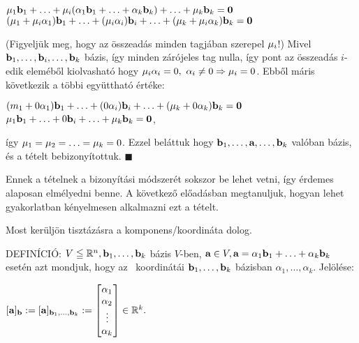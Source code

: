 \documentclass[a4paper,11.5pt]{article}
\begin{document}
	\begin{center}
		$\mu_1\textbf{b}_1+\ldots+\mu_i(\alpha_1\textbf{b}_1+\ldots+\alpha_k\textbf{b}_k)+\ldots+\mu_k\textbf{b}_k=\textbf{0}$\\
		$(\mu_1+\mu_i\alpha_1)\textbf{b}_1+\ldots+(\mu_i\alpha_i)\textbf{b}_i+\ldots+(\mu_k+\mu_i\alpha_k)\textbf{b}_k=\textbf{0}$
	\end{center}
	(Figyeljük meg, hogy az összeadás minden tagjában szerepel $\mu_i$!) Mivel $\textbf{b}_1,\ldots,\textbf{b}_i,\ldots,\textbf{b}_k$ bázis, így minden zárójeles tag nulla, így pont az összeadás $i$-edik eleméből kiolvasható hogy $\m_i\alpha_i=0,\ \alpha_i\not=0 \Rightarrow \mu_i=0$. Ebből máris következik a többi együttható értéke:
	
	\begin{center}
		$(m_1+0\alpha_1)\textbf{b}_1+\ldots+(0\alpha_i)\textbf{b}_i+\ldots+(\mu_k+0\alpha_k)\textbf{b}_k=\textbf{0}$\\
		$\mu_1\textbf{b}_1+\ldots+0\textbf{b}_i+\ldots+\mu_k\textbf{b}_k=\textbf{0}$,\\
	\end{center}
	   így $\mu_1=\mu_2=\ldots=\mu_k=0$. Ezzel beláttuk hogy $\textbf{b}_1,\ldots,\textbf{a},\ldots,\textbf{b}_k$ valóban bázis, és a tételt bebizonyítottuk. $\blacksquare$
	
	Ennek a tételnek a bizonyítási módszerét sokszor be lehet vetni, így érdemes alaposan elmélyedni benne. A következő előadásban megtanuljuk, hogyan lehet gyakorlatban kényelmesen alkalmazni ezt a tételt.
	
	\smallskip
	Most kerüljön tisztázásra a komponens/koordináta dolog.
	
	DEFINÍCIÓ: $V\leqq \mathbb{R}^{n}, \textbf{b}_1,\ldots,\textbf{b}_k$ bázis $V$-ben, $\textbf{a} \in V, \textbf{a} = \alpha_1\textbf{b}_1+\ldots+\alpha_k\textbf{b}_k$ esetén azt mondjuk, hogy az \a~koordinátái $\textbf{b}_1,\ldots,\textbf{b}_k$ bázisban $\alpha_1, \ldots, \alpha_k$. Jelölése:
	
	\begin{center}
		$[\a]_\b:=[\a]_{\b_1,\ldots,\b_k}:=
		\begin{bmatrix}
			\alpha_1\s\\
			\alpha_2\s\\
			\vdots\\
			\alpha_k\s
		\end{bmatrix}\in\R^k.$
	\end{center}
	
\end{document}
